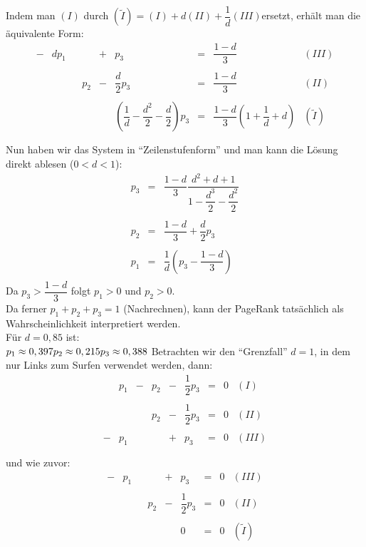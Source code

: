 \documentclass{scrbook}
\begin{document}
Indem man \((I)\) durch \((\tilde{I}) = (I)+d(II)+\dfrac{1}{d}(III)\)ersetzt, erhält man die äquivalente Form:
\[\begin{array}{lrlrlrclc}
-&d p_1&&&+&p_3&=&\dfrac{1-d}{3}&(III)\\\\
&&&p_2&-&\dfrac{d}{2}p_3&=&\dfrac{1-d}{3}&(II)\\\\
&&&&&(\dfrac{1}{d}-\dfrac{d^2}{2}-\dfrac{d}{2})p_3&=&\dfrac{1-d}{3}(1+\dfrac{1}{d}+d)&(\tilde{I})\\\\
\end{array}
\]
Nun haben wir das System in "`Zeilenstufenform"' und man kann die Lösung direkt ablesen (\( 0<d<1\)):
\[
\begin{array}{lcl}
p_3&=&\dfrac{1-d}{3}\dfrac{d^2+d+1}{1-\dfrac{d^3}{2}-\dfrac{d^2}{2}}\\
\\
p_2&=&\dfrac{1-d}{3}+\dfrac{d}{2}p_3\\
\\
p_1&=&\dfrac{1}{d}(p_3-\dfrac{1-d}{3})\\
\end{array}
\]
Da \(p_3>\dfrac{1-d}{3}\) folgt \(p_1>0\) und \(p_2>0\).\\
Da ferner \(p_1+p_2+p_3=1\) (Nachrechnen), kann der PageRank tatsächlich als Wahrscheinlichkeit interpretiert werden.\\
Für \(d=0,85\) ist:\\
\(
p_1 \approx 0,397\\
p_2 \approx 0,215\\
p_3 \approx 0,388\\
\)
Betrachten wir den "`Grenzfall"' \(d=1\), in dem nur Links zum Surfen verwendet werden, dann:
\[
\begin{array}{lrlrlrclc}
&p_1&-&p_2 &-&\dfrac{1}{2}p_3&=&0&(I)\\\\
&&&p_2&-&\dfrac{1}{2}p_3&=&0&(II)\\\\
-&p_1&&&+&p_3&=&0&(III)\\\\
\end{array}
\]
und wie zuvor:
\[
\begin{array}{lrlrlrclc}
-&p_1&&&+&p_3&=&0&(III)\\\\
&&&p_2&-&\dfrac{1}{2}p_3&=&0&(II)\\\\
&&&&&0&=&0&(\tilde{I})\\\\
\end{array}
\]
\end{document}

